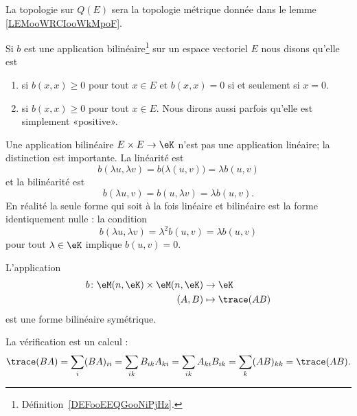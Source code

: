 La topologie sur \( Q(E)\) sera la topologie métrique donnée dans le lemme \ref{LEMooWRCIooWkMpoF}.

\begin{definition}      \label{DEFooJIAQooZkBtTy}
	Si \( b\) est une application bilinéaire\footnote{Définition~\ref{DEFooEEQGooNiPjHz}.} sur un espace vectoriel \( E\) nous disons qu'elle est
	\begin{enumerate}
		\item
		       si \( b(x,x)\geq 0\) pour tout \( x\in E\) et \( b(x,x)=0\) si et seulement si \( x=0\).
		\item
		       si \( b(x,x)\geq 0\) pour tout \( x\in E\). Nous dirons aussi parfois qu'elle est simplement «positive».
	\end{enumerate}
\end{definition}

\begin{normaltext}
	Une application bilinéaire \( E\times E\to \eK\) n'est pas une application linéaire; la distinction est importante. La linéarité est
	\begin{equation}
		b(\lambda u,\lambda v)= b\big( \lambda(u,v) \big)=\lambda b(u,v)
	\end{equation}
	et la bilinéarité est
	\begin{equation}
		b(\lambda u,v)=b(u,\lambda v)=\lambda b(u,v).
	\end{equation}
	En réalité la seule forme qui soit à la fois linéaire et bilinéaire est la forme identiquement nulle : la condition
	\begin{equation}
		b(\lambda u,\lambda v)=\lambda^2b(u,v)=\lambda b(u,v)
	\end{equation}
	pour tout \( \lambda\in \eK\) implique \( b(u,v)=0\).
\end{normaltext}

\begin{example}       \label{EXooKFBOooJjXZwu}
	L'application
	\begin{equation}
		\begin{aligned}
			b\colon \eM(n,\eK)\times \eM(n,\eK) & \to \eK            \\
			(A,B)                               & \mapsto \trace(AB)
		\end{aligned}
	\end{equation}
	est une forme bilinéaire symétrique.

	La vérification est un calcul :
	\begin{equation}
		\trace(BA)=\sum_{i}(BA)_{ii}=\sum_{ik}B_{ik}A_{ki}=\sum_{ik}A_{ki}B_{ik}=\sum_k(AB)_{kk}=\trace(AB).
	\end{equation}
\end{example}

